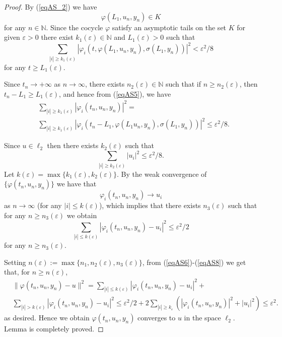 \documentclass{amsart}%
\begin{document}
\begin{proof}
By (\ref{eqAS_2}) we have
\begin{equation}\label{eqAS4}
\varphi(L_{1},u_n,y_n)\in K
\end{equation}
for any $n\in \mathbb N$. Since the cocycle $\varphi$ satisfy an
asymptotic tails on the set $K$ for given $\varepsilon
>0$ there exist $k_{1}(\varepsilon)\in \mathbb N$ and
$L_{1}(\varepsilon)>0$ such that
\begin{equation}\label{eqAS5}
\sum\limits_{|i|\ge
k_{1}(\varepsilon)}|\varphi_{i}(t,\varphi(L_{1},u_n,y_n),\sigma(L_{1},y_n))|^{2}<\varepsilon^{2}/8
\end{equation}
for any $t\ge L_{1}(\varepsilon)$.

Since $t_n\to +\infty$ as $n\to \infty$, there exists
$n_{2}(\varepsilon)\in \mathbb N$ such  that if $n\ge
n_{2}(\varepsilon)$, then $t_n - L_{1}\ge L_{1}(\varepsilon)$, and
hence from (\ref{eqAS5}), we have
\begin{eqnarray}\label{eqAS6}
& \sum\limits_{|i|\ge
k_{1}(\varepsilon)}|\varphi_{i}(t_n,u_n,y_n)|^{2}=
\\
& \sum\limits_{|i|\ge
k_{1}(\varepsilon)}|\varphi_{i}(t_n-L_{1},\varphi(L_{1}u_n,y_n),\sigma(L_1,y_n))|^{2}\le
\varepsilon^{2}/8.\nonumber
\end{eqnarray}

Since $u\in \ell_{2}$ then there exists $k_{2}(\varepsilon)$ such
that
\begin{equation}\label{eqAS7}
\sum\limits_{|i|\ge k_{2}(\varepsilon)}|u_{i}|^{2}\le
\varepsilon^{2}/8.
\end{equation}
Let $k(\varepsilon)=\max\{k_1(\varepsilon),k_{2}(\varepsilon)\}$.
By the weak convergence of $\{\varphi(t_n,u_n,y_n)\}$ we have that
\begin{equation}\label{eqAS8_1}
\varphi_{i}(t_n,u_n,y_n)\to u_{i}\nonumber
\end{equation}
as $n\to \infty$ (for any $|i|\le k(\varepsilon)$), which implies
that there exists $n_{3}(\varepsilon)$ such that for any $n\ge
n_{3}(\varepsilon)$ we obtain
\begin{equation}\label{eqAS8}
\sum\limits_{|i|\le
k(\varepsilon)}|\varphi_{i}(t_n,u_n,y_n)-u_{i}|^{2}\le
\varepsilon^{2}/2
\end{equation}
for any $n\ge n_{3}(\varepsilon).$

Setting
$n(\varepsilon):=\max\{n_{1},n_{2}(\varepsilon),n_{3}(\varepsilon)\}$,
from (\ref{eqAS6})-(\ref{eqAS8}) we get that, for $n\ge
n(\varepsilon)$,
\begin{eqnarray}\label{eqAS9}
& \|\varphi(t_n,u_n,y_n)-u\|^{2}=\sum\limits_{|i|\le
k(\varepsilon)}|\varphi_{i}(t_n,u_n,y_n)-u_{i}|^{2} +\nonumber\\
& \sum\limits_{|i|>
k(\varepsilon)}|\varphi_{i}(t_n,u_n,y_n)-u_{i}|^{2}\le
\varepsilon^{2}/2+2\sum\limits_{|i|\ge
k_{\varepsilon}}(|\varphi_{i}(t_n,u_n,y_n)|^{2}+|u_{i}|^{2})\le
\varepsilon^{2}.\nonumber
\end{eqnarray}
as desired. Hence we obtain $\varphi(t_n,u_n,y_n)$ converges to $u$
in the space $\ell_{2}$. Lemma is completely proved.
\end{proof}
\end{document}
